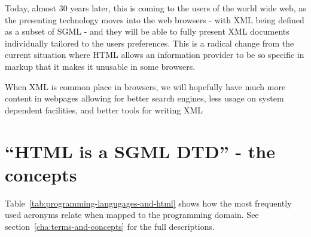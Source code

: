 Today, almost 30 years later, this is coming to the users of the world
wide web, as the presenting technology moves into the web browsers -
with XML being defined as a subset of SGML - and they will be able to
fully present XML documents individually tailored to the users
preferences.  This is a radical change from the current situation
where HTML allows an information provider to be so specific in markup
that it makes it unusable in some browsers.

\textsf{When XML is common place in browsers, we will hopefully have
  much more content in webpages allowing for better search engines,
  less usage on system dependent facilities, and better tools for
  writing XML }


\section{``HTML is a SGML DTD'' - the concepts}

Table~\vref{tab:programming-langugages-and-html} shows how the most
frequently used acronyms relate when mapped to the programming domain.
See section~\vref{cha:terms-and-concepts} for the full descriptions.


